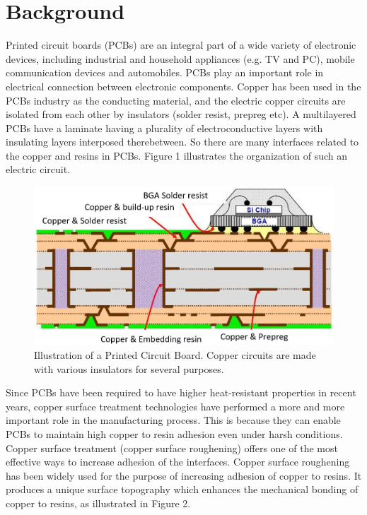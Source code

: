 \documentclass[10pt,twocolumn,letterpaper]{article}
\begin{document}
\section{Background}

Printed circuit boards (PCBs) are an integral part of a wide variety of electronic devices, 
including industrial and household appliances (e.g. TV and PC), 
mobile communication devices and automobiles. 
PCBs play an important role in electrical connection between electronic components. 
Copper has been used in the PCBs industry as the conducting material, 
and the electric copper circuits are isolated from each other by insulators (solder resist, prepreg etc). 
A multilayered PCBs have a laminate having a plurality of electroconductive 
layers with insulating layers interposed therebetween. 
So there are many interfaces related to the copper and resins in PCBs. 
Figure 1 illustrates the organization of such an electric circuit.


\begin{figure}[h]
\centering
\includegraphics[width=0.9\linewidth]{"./figures/Figure1"}
\caption{
Illustration of a Printed Circuit Board. 
Copper circuits are made with various insulators for several purposes.  
}
\end{figure}


Since PCBs have been required to have higher heat-resistant properties in recent years, 
copper surface treatment technologies have performed a more and more important role in the manufacturing process. 
This is because they can enable PCBs to maintain high copper to resin adhesion even under harsh conditions. Copper surface treatment (copper surface roughening) offers one of the most effective ways to increase adhesion of the interfaces. Copper surface roughening has been widely used for the purpose of increasing adhesion of copper to resins. It produces a unique surface topography which enhances the mechanical bonding of copper to resins, as illustrated in Figure 2.
\end{document}

